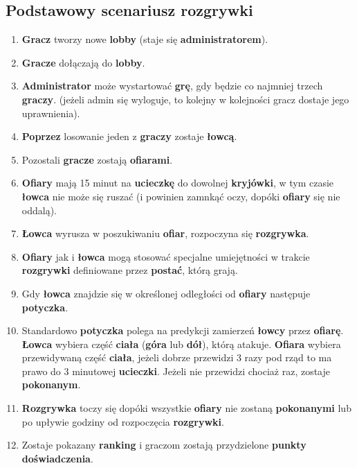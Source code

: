 \documentclass[a4paper,11pt,notitlepage]{article}
\begin{document}
\subsection{Podstawowy scenariusz rozgrywki}
\begin{enumerate}
\item
	\textbf{Gracz} tworzy nowe \textbf{lobby} (staje się \textbf{administratorem}).
	
\item
	\textbf{Gracze} dołączają do \textbf{lobby}.
	
\item
	\textbf{Administrator} może wystartować \textbf{grę}, gdy będzie co najmniej trzech \textbf{graczy}. (jeżeli admin się wyloguje, to kolejny w kolejności gracz dostaje jego uprawnienia).
	
\item
	\textbf{Poprzez} losowanie jeden z \textbf{graczy} zostaje \textbf{łowcą}.
	
\item
	Pozostali \textbf{gracze} zostają \textbf{ofiarami}.
	
\item
	\textbf{Ofiary} mają 15 minut na \textbf{ucieczkę} do dowolnej \textbf{kryjówki}, w tym czasie \textbf{łowca} nie może się ruszać (i powinien zamnkąć oczy, dopóki \textbf{ofiary} się nie oddalą).
	
\item
	\textbf{Łowca} wyrusza w poszukiwaniu \textbf{ofiar}, rozpoczyna się \textbf{rozgrywka}.
	
\item
	\textbf{Ofiary} jak i \textbf{łowca} mogą stosować specjalne umiejętności w trakcie \textbf{rozgrywki} definiowane przez \textbf{postać}, którą grają.
	
\item
	Gdy \textbf{łowca} znajdzie się w określonej odległości od \textbf{ofiary} następuje \textbf{potyczka}.
	
\item
	Standardowo \textbf{potyczka} polega na predykcji zamierzeń \textbf{łowcy} przez \textbf{ofiarę}. \textbf{Łowca} wybiera część \textbf{ciała} (\textbf{góra} lub \textbf{dół}), którą atakuje. \textbf{Ofiara} wybiera przewidywaną część \textbf{ciała}, jeżeli dobrze przewidzi 3 razy pod rząd to ma prawo do 3 minutowej \textbf{ucieczki}. Jeżeli nie przewidzi chociaż raz, zostaje \textbf{pokonanym}.
	
\item
	\textbf{Rozgrywka} toczy się dopóki wszystkie \textbf{ofiary} nie zostaną \textbf{pokonanymi} lub po upływie godziny od rozpoczęcia \textbf{rozgrywki}.
	
\item
	Zostaje pokazany \textbf{ranking} i graczom zostają przydzielone \textbf{punkty doświadczenia}.
	
\end{enumerate}
\end{document}
